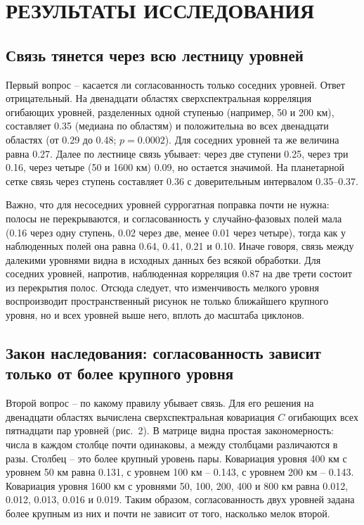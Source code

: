 \documentclass[12pt,a4paper]{article}
\begin{document}
\section{РЕЗУЛЬТАТЫ ИССЛЕДОВАНИЯ}

\subsection{Связь тянется через всю лестницу уровней}

Первый вопрос -- касается ли согласованность только соседних уровней. Ответ отрицательный. На двенадцати областях сверхспектральная корреляция огибающих уровней, разделенных одной ступенью (например, 50 и 200 км), составляет 0.35 (медиана по областям) и положительна во всех двенадцати областях (от 0.29 до 0.48; $p = 0.0002$). Для соседних уровней та же величина равна 0.27. Далее по лестнице связь убывает: через две ступени 0.25, через три 0.16, через четыре (50 и 1600 км) 0.09, но остается значимой. На планетарной сетке связь через ступень составляет 0.36 с доверительным интервалом 0.35--0.37.

Важно, что для несоседних уровней суррогатная поправка почти не нужна: полосы не перекрываются, и согласованность у случайно-фазовых полей мала (0.16 через одну ступень, 0.02 через две, менее 0.01 через четыре), тогда как у наблюденных полей она равна 0.64, 0.41, 0.21 и 0.10. Иначе говоря, связь между далекими уровнями видна в исходных данных без всякой обработки. Для соседних уровней, напротив, наблюденная корреляция 0.87 на две трети состоит из перекрытия полос. Отсюда следует, что изменчивость мелкого уровня воспроизводит пространственный рисунок не только ближайшего крупного уровня, но и всех уровней выше него, вплоть до масштаба циклонов.

\subsection{Закон наследования: согласованность зависит только от более крупного уровня}

Второй вопрос -- по какому правилу убывает связь. Для его решения на двенадцати областях вычислена сверхспектральная ковариация $C$ огибающих всех пятнадцати пар уровней (рис.~2). В матрице видна простая закономерность: числа в каждом столбце почти одинаковы, а между столбцами различаются в разы. Столбец -- это более крупный уровень пары. Ковариация уровня 400 км с уровнем 50 км равна 0.131, с уровнем 100 км -- 0.143, с уровнем 200 км -- 0.143. Ковариация уровня 1600 км с уровнями 50, 100, 200, 400 и 800 км равна 0.012, 0.012, 0.013, 0.016 и 0.019. Таким образом, согласованность двух уровней задана более крупным из них и почти не зависит от того, насколько мелок второй.
\end{document}
